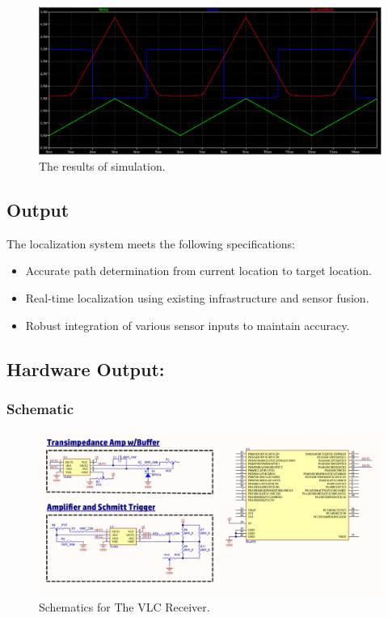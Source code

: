 \begin{figure}[h!]
	\centering
	\includegraphics[scale=0.3]{Figures/HW/amp-schmitt-ltspice-results.png}
	\caption{The results of simulation.}
	\label{fig:hw-amp-schmitt-results}
\end{figure}


\newpage
\subsection{Output}
The localization system meets the following specifications:
\begin{itemize}
	\item Accurate path determination from current location to target location.
	\item Real-time localization using existing infrastructure and sensor fusion.
	\item Robust integration of various sensor inputs to maintain accuracy.
\end{itemize}

\subsection{Hardware Output:}
\subsubsection{Schematic}
\begin{figure}[h!]
	\centering
	\includegraphics[scale=0.3]{Figures/HW/schem-vlc.png}
	\caption{Schematics for The VLC Receiver.}
	\label{fig:hw-vlc-schem}
\end{figure}

